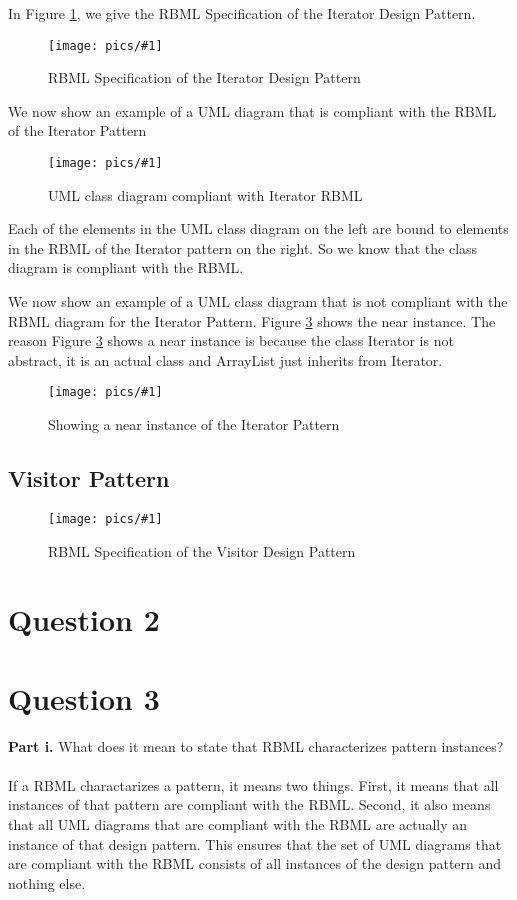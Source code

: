 \documentclass{article}
\newcommand{\fig}[3]{ 
	\begin{figure}[h]
		\centering
		\caption{#3}
		\texttt{[image: pics/\#1]}
		\label{fig:#1}
	\end{figure} 
}
\begin{document}
In Figure \ref{fig:iterator-rbml}, we give the RBML Specification of the Iterator Design Pattern.

\fig{iterator-rbml}{.5}{RBML Specification of the Iterator Design Pattern}

We now show an example of a UML diagram that is compliant with the RBML of the Iterator Pattern

\fig{iterator-inst}{0.75}{UML class diagram compliant with Iterator RBML}

Each of the elements in the UML class diagram on the left are bound to elements in the RBML of the Iterator pattern on the right. So we know that the class diagram is compliant with the RBML.

We now show an example of a UML class diagram that is not compliant with the RBML diagram for the Iterator Pattern. Figure \ref{fig:iterator-ninst} shows the near instance. The reason Figure \ref{fig:iterator-ninst} shows a near instance is because the class Iterator is not abstract, it is an actual class and ArrayList just inherits from Iterator.

\fig{iterator-ninst}{0.15}{Showing a near instance of the Iterator Pattern}

\subsection*{Visitor Pattern}

\fig{visitor-rbml}{.75}{RBML Specification of the Visitor Design Pattern}

\newpage

\section*{Question 2}

\newpage

\section*{Question 3}

{\bf Part i.} 
What does it mean to state that RBML characterizes pattern instances? \\\\
If a RBML charactarizes a pattern, it means two things. First, it means that all instances of that pattern are compliant with the RBML. Second, it also means that all UML diagrams that are compliant with the RBML are actually an instance of that design pattern. This ensures that the set of UML diagrams that are compliant with the RBML consists of all instances of the design pattern and nothing else.
\newline
\end{document}
